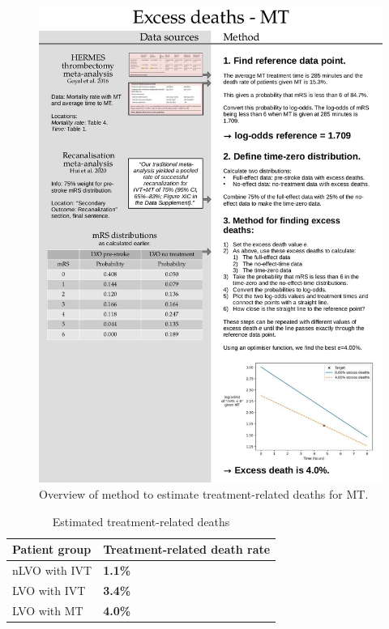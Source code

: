 \begin{figure}[h!]
    \centering
    \includegraphics[width=1.0\linewidth]{images_modelling/data_sources_excess-death-mt.png}
    \caption{Overview of method to estimate treatment-related deaths for MT.}
    \label{fig:mt_deaths}
\end{figure}


\begin{table}[h!]
    \centering
    \caption{Estimated treatment-related deaths}
    \begin{tabular}{l l}
    Patient group & Treatment-related death rate\\
    \hline
    nLVO with IVT & \textbf{1.1\%}\\
    LVO with IVT & \textbf{3.4\%}\\
    LVO with MT & \textbf{4.0\%}\\
    \end{tabular}
    \label{tab:treatment_deaths}
\end{table}


